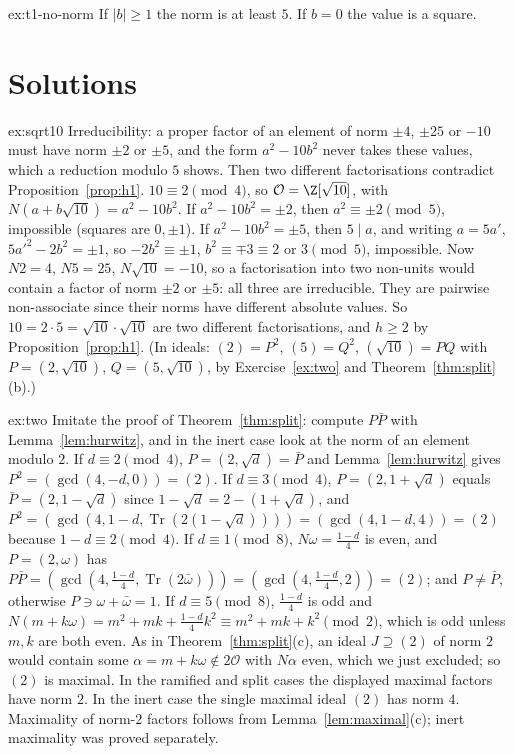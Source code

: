 \begin{hint}{ex:t1-no-norm}
If $|b|\ge 1$ the norm is at least $5$. If $b=0$ the value is a square.
\end{hint}

\section{Solutions}

\begin{solution}{ex:sqrt10}
\idea Irreducibility: a proper factor of an element of norm $\pm4$, $\pm25$ or $-10$ must have norm $\pm2$ or $\pm5$, and the form $a^2-10b^2$ never takes these values, which a reduction modulo $5$ shows. Then two different factorisations contradict Proposition~\ref{prop:h1}.
\writeup $10\equiv2\pmod4$, so $\mathcal O=\Z[\sqrt{10}]$, with $N(a+b\sqrt{10})=a^2-10b^2$. If $a^2-10b^2=\pm2$, then $a^2\equiv\pm2\pmod5$, impossible (squares are $0,\pm1$). If $a^2-10b^2=\pm5$, then $5\mid a$, and writing $a=5a'$, $5a'^2-2b^2=\pm1$, so $-2b^2\equiv\pm1$, $b^2\equiv\mp3\equiv2$ or $3\pmod5$, impossible. Now $N2=4$, $N5=25$, $N\sqrt{10}=-10$, so a factorisation into two non-units would contain a factor of norm $\pm2$ or $\pm5$: all three are irreducible. They are pairwise non-associate since their norms have different absolute values. So $10=2\cdot5=\sqrt{10}\cdot\sqrt{10}$ are two different factorisations, and $h\ge2$ by Proposition~\ref{prop:h1}. (In ideals: $(2)=P^2$, $(5)=Q^2$, $(\sqrt{10})=PQ$ with $P=(2,\sqrt{10})$, $Q=(5,\sqrt{10})$, by Exercise~\ref{ex:two} and Theorem~\ref{thm:split}(b).)
\end{solution}

\begin{solution}{ex:two}
\idea Imitate the proof of Theorem~\ref{thm:split}: compute $P\bar P$ with Lemma~\ref{lem:hurwitz}, and in the inert case look at the norm of an element modulo $2$.
\writeup If $d\equiv2\pmod4$, $P=(2,\sqrt d)=\bar P$ and Lemma~\ref{lem:hurwitz} gives $P^2=(\gcd(4,-d,0))=(2)$. If $d\equiv3\pmod4$, $P=(2,1+\sqrt d)$ equals $\bar P=(2,1-\sqrt d)$ since $1-\sqrt d=2-(1+\sqrt d)$, and $P^2=(\gcd(4,1-d,\operatorname{Tr}(2(1-\sqrt d))))=(\gcd(4,1-d,4))=(2)$ because $1-d\equiv2\pmod4$. If $d\equiv1\pmod8$, $N\omega=\frac{1-d}4$ is even, and $P=(2,\omega)$ has $P\bar P=(\gcd(4,\frac{1-d}4,\operatorname{Tr}(2\bar\omega)))=(\gcd(4,\tfrac{1-d}4,2))=(2)$; and $P\ne\bar P$, otherwise $P\ni\omega+\bar\omega=1$. If $d\equiv5\pmod8$, $\frac{1-d}4$ is odd and $N(m+k\omega)=m^2+mk+\frac{1-d}4k^2\equiv m^2+mk+k^2\pmod2$, which is odd unless $m,k$ are both even. As in Theorem~\ref{thm:split}(c), an ideal $J\supseteq(2)$ of norm $2$ would contain some $\alpha=m+k\omega\notin2\mathcal O$ with $N\alpha$ even, which we just excluded; so $(2)$ is maximal. In the ramified and split cases the displayed maximal factors have norm $2$. In the inert case the single maximal ideal $(2)$ has norm $4$. Maximality of norm-$2$ factors follows from Lemma~\ref{lem:maximal}(c); inert maximality was proved separately.
\end{solution}

